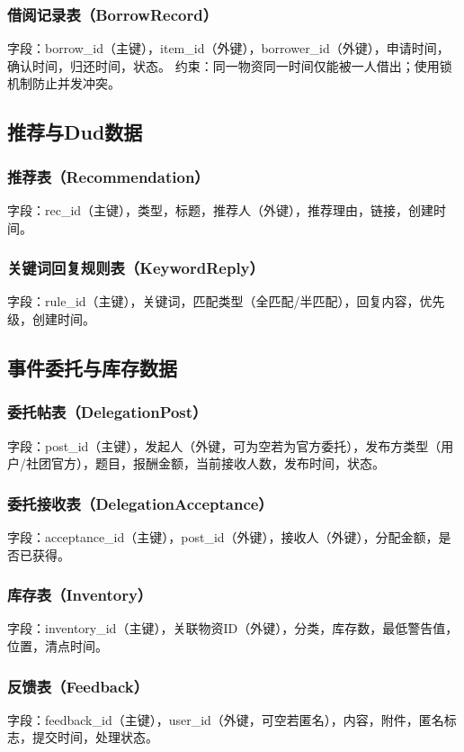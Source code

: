 \documentclass[a4paper,12pt]{article}
\begin{document}
\subsubsection{借阅记录表（BorrowRecord）}
字段：borrow\_id（主键），item\_id（外键），borrower\_id（外键），申请时间，确认时间，归还时间，状态。
约束：同一物资同一时间仅能被一人借出；使用锁机制防止并发冲突。

\subsection{推荐与Dud数据}
\subsubsection{推荐表（Recommendation）}
字段：rec\_id（主键），类型，标题，推荐人（外键），推荐理由，链接，创建时间。

\subsubsection{关键词回复规则表（KeywordReply）}
字段：rule\_id（主键），关键词，匹配类型（全匹配/半匹配），回复内容，优先级，创建时间。

\subsection{事件委托与库存数据}
\subsubsection{委托帖表（DelegationPost）}
字段：post\_id（主键），发起人（外键，可为空若为官方委托），发布方类型（用户/社团官方），题目，报酬金额，当前接收人数，发布时间，状态。

\subsubsection{委托接收表（DelegationAcceptance）}
字段：acceptance\_id（主键），post\_id（外键），接收人（外键），分配金额，是否已获得。

\subsubsection{库存表（Inventory）}
字段：inventory\_id（主键），关联物资ID（外键），分类，库存数，最低警告值，位置，清点时间。

\subsubsection{反馈表（Feedback）}
字段：feedback\_id（主键），user\_id（外键，可空若匿名），内容，附件，匿名标志，提交时间，处理状态。
\end{document}
